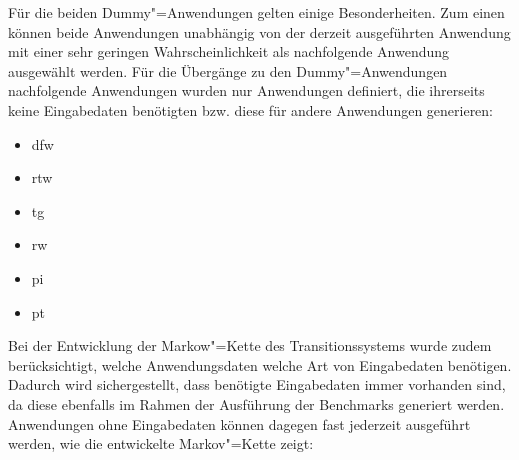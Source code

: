 Für die beiden Dummy"=Anwendungen gelten einige Besonderheiten.
Zum einen können beide Anwendungen unabhängig von der derzeit ausgeführten Anwendung mit einer sehr geringen Wahrscheinlichkeit als nachfolgende Anwendung ausgewählt werden.
Für die Übergänge zu den Dummy"=Anwendungen nachfolgende Anwendungen wurden nur Anwendungen definiert, die ihrerseits keine Eingabedaten benötigten bzw. diese für andere Anwendungen generieren:

\begin{itemize}
    \item \acl{dfw}
    \item \acl{rtw}
    \item \acl{tg}
    \item \acl{rw}
    \item \acl{pi}
    \item \acl{pt}
\end{itemize}

Bei der Entwicklung der Markow"=Kette des Transitionssystems wurde zudem berücksichtigt, welche Anwendungsdaten welche Art von Eingabedaten benötigen.
Dadurch wird sichergestellt, dass benötigte Eingabedaten immer vorhanden sind, da diese ebenfalls im Rahmen der Ausführung der Benchmarks generiert werden.
Anwendungen ohne Eingabedaten können dagegen fast jederzeit ausgeführt werden, wie die entwickelte Markov"=Kette zeigt:

